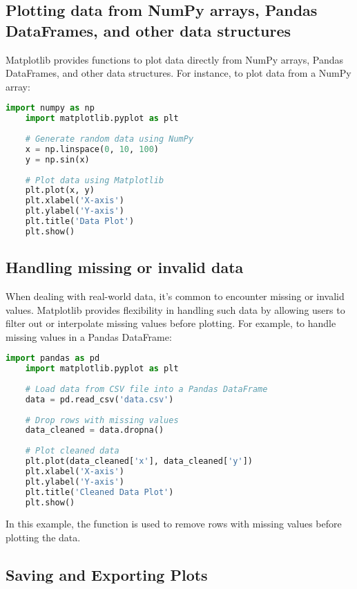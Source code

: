 \subsection*{Plotting data from NumPy arrays, Pandas DataFrames, and other data structures}

Matplotlib provides functions to plot data directly from NumPy arrays, Pandas DataFrames, and other data structures. For instance, to plot data from a NumPy array:

\begin{lstlisting}[language=Python, caption={Plotting data from a NumPy array}]
	import numpy as np
	import matplotlib.pyplot as plt
	
	# Generate random data using NumPy
	x = np.linspace(0, 10, 100)
	y = np.sin(x)
	
	# Plot data using Matplotlib
	plt.plot(x, y)
	plt.xlabel('X-axis')
	plt.ylabel('Y-axis')
	plt.title('Data Plot')
	plt.show()
\end{lstlisting}

\subsection*{Handling missing or invalid data}

When dealing with real-world data, it's common to encounter missing or invalid values. Matplotlib provides flexibility in handling such data by allowing users to filter out or interpolate missing values before plotting. For example, to handle missing values in a Pandas DataFrame:

\begin{lstlisting}[language=Python, caption={Handling missing values in a Pandas DataFrame}]
	import pandas as pd
	import matplotlib.pyplot as plt
	
	# Load data from CSV file into a Pandas DataFrame
	data = pd.read_csv('data.csv')
	
	# Drop rows with missing values
	data_cleaned = data.dropna()
	
	# Plot cleaned data
	plt.plot(data_cleaned['x'], data_cleaned['y'])
	plt.xlabel('X-axis')
	plt.ylabel('Y-axis')
	plt.title('Cleaned Data Plot')
	plt.show()
\end{lstlisting}

In this example, the  function is used to remove rows with missing values before plotting the data.

\subsection*{Saving and Exporting Plots}

